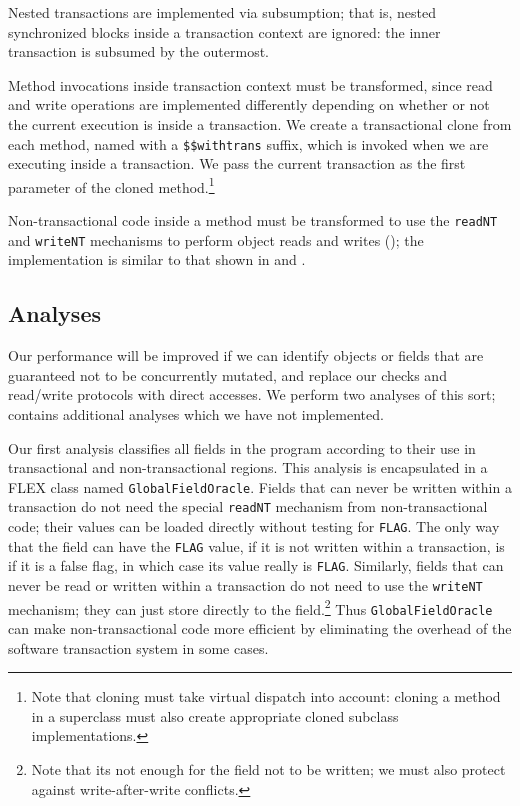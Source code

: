 Nested transactions are implemented via subsumption; that is, nested
synchronized blocks inside a transaction context are ignored: the
inner transaction is subsumed by the outermost.

\label{sec:withtrans}
Method invocations inside transaction context must be transformed,
since read and write operations are implemented differently depending
on whether or not the current execution is inside a transaction.  We
create a transactional clone from each method, named with a
\texttt{\$\$withtrans} suffix, which is invoked when we are executing
inside a transaction.  We pass the current transaction as the first
parameter of the cloned method.\footnote{Note that cloning must take virtual
  dispatch into account: cloning a method in a superclass must also
  create appropriate cloned subclass implementations.}

Non-transactional code inside a method must be transformed to use the
\texttt{readNT} and \texttt{writeNT} mechanisms to perform object
reads and writes (); the implementation is similar to
that shown in  and .

\subsection{Analyses}\label{sec:hoist} %
Our performance will be improved if we can identify objects or fields
that are guaranteed not to be concurrently mutated, and replace our
checks and read/write protocols with direct accesses.  We perform two
analyses of this sort;  contains additional analyses
which we have not implemented.

Our first analysis classifies all fields in the program according to
their use in transactional and non-transactional regions.  This
analysis is encapsulated in a FLEX class named
\texttt{GlobalFieldOracle}.  Fields that can never be written within
a transaction do not need the special \texttt{readNT} mechanism from
non-transactional code; their values can be loaded directly without
testing for \texttt{FLAG}.  The only way that the field can have the
\texttt{FLAG} value, if it is not written within a transaction, is if
it is a false flag, in which case its value really is \texttt{FLAG}.
Similarly, fields that can never be read or written within a
transaction do not need to use the \texttt{writeNT} mechanism; they
can just store directly to the field.\footnote{Note that its not
  enough for the field not to be written; we must also protect against
  write-after-write conflicts.}  Thus \texttt{GlobalFieldOracle} can
make non-transactional code more efficient by eliminating the overhead
of the software transaction system in some cases.

